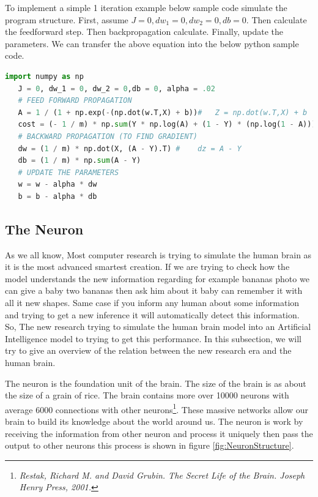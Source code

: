 To implement a simple 1 iteration example below sample code simulate the program structure. First,  assume $J = 0, dw_1 = 0, dw_2 = 0,db = 0$. Then calculate the feedforward step. Then backpropagation calculate. Finally, update the parameters. We can transfer the above equation into the below python sample code. 
 \begin{lstlisting}[language=Python]
   import numpy as np
   J = 0, dw_1 = 0, dw_2 = 0,db = 0, alpha = .02
   # FEED FORWARD PROPAGATION
   A = 1 / (1 + np.exp(-(np.dot(w.T,X) + b))#   Z = np.dot(w.T,X) + b
   cost = (- 1 / m) * np.sum(Y * np.log(A) + (1 - Y) * (np.log(1 - A)))
   # BACKWARD PROPAGATION (TO FIND GRADIENT)
   dw = (1 / m) * np.dot(X, (A - Y).T) #    dz = A - Y
   db = (1 / m) * np.sum(A - Y)
   # UPDATE THE PARAMETERS
   w = w - alpha * dw
   b = b - alpha * db
 \end{lstlisting}

\newpage 
 \subsection{The Neuron}

 As we all know, Most computer research is trying to simulate the human brain as it is the most advanced smartest creation. If we are trying to check how the model understands the new information regarding for example bananas photo we can give a baby two bananas then ask him about it baby can remember it with all it new shapes. Same case if you inform any human about some information and trying to get a new inference it will automatically detect this information. So, The new research trying to simulate the human brain model into an Artificial Intelligence model to trying to get this performance. In this subsection, we will try to give an overview of the relation between the new research era and the human brain.
 
 The neuron is the foundation unit of the brain. The size of the brain is as about the size of a grain of rice. The brain contains more over 10000 neurons with average 6000 connections with other neurons\footnote{\textit{Restak, Richard M. and David Grubin. The Secret Life of the Brain. Joseph Henry Press, 2001.}}.  These massive networks allow our brain to build its knowledge about the world around us. The neuron is work by receiving the information from other neuron and process it uniquely then pass the output to other neurons this process is shown in figure \ref{fig:NeuronStructure}.

